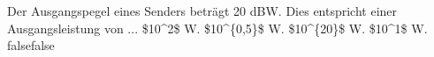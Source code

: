     {Der Ausgangspegel eines Senders beträgt 20 dBW. Dies entspricht einer Ausgangsleistung von ...}
    {\$10\textasciicircum{}2\$ W.}
    {\$10\textasciicircum{}\{0,5\}\$ W.}
    {\$10\textasciicircum{}\{20\}\$ W.}
    {\$10\textasciicircum{}1\$ W.}
    {false}{false}